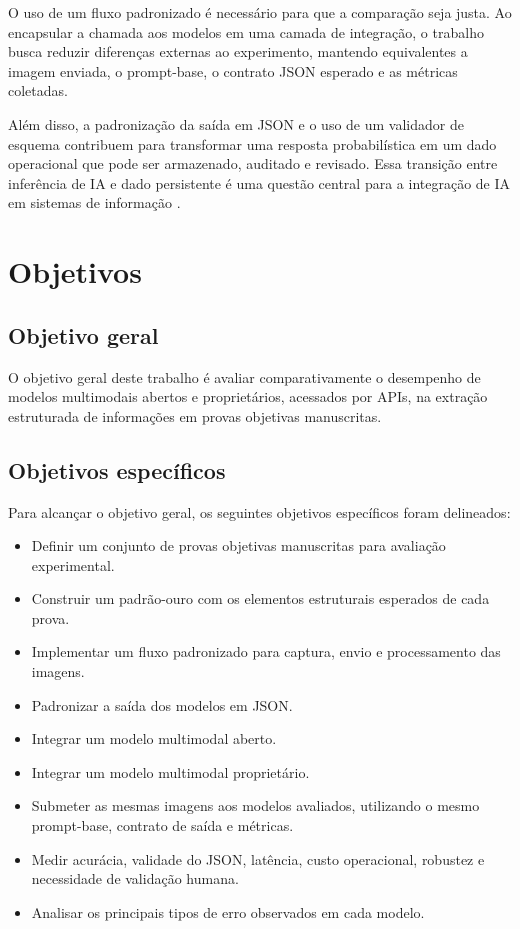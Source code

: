 O uso de um fluxo padronizado é necessário para que a comparação seja justa. Ao encapsular a chamada aos modelos em uma camada de integração, o trabalho busca reduzir diferenças externas ao experimento, mantendo equivalentes a imagem enviada, o prompt-base, o contrato JSON esperado e as métricas coletadas.

Além disso, a padronização da saída em JSON e o uso de um validador de esquema contribuem para transformar uma resposta probabilística em um dado operacional que pode ser armazenado, auditado e revisado. Essa transição entre inferência de IA e dado persistente é uma questão central para a integração de IA em sistemas de informação \cite{nist2023airmf,raji2020audit,amershi2019humanai,mitchell2019modelcards}.

\section{Objetivos}

\subsection{Objetivo geral}\label{objger}

O objetivo geral deste trabalho é avaliar comparativamente o desempenho de modelos multimodais abertos e proprietários, acessados por APIs, na extração estruturada de informações em provas objetivas manuscritas.

\subsection{Objetivos específicos}\label{objesp}

Para alcançar o objetivo geral, os seguintes objetivos específicos foram delineados:

\begin{itemize}
    \item Definir um conjunto de provas objetivas manuscritas para avaliação experimental.
    \item Construir um padrão-ouro com os elementos estruturais esperados de cada prova.
    \item Implementar um fluxo padronizado para captura, envio e processamento das imagens.
    \item Padronizar a saída dos modelos em JSON.
    \item Integrar um modelo multimodal aberto.
    \item Integrar um modelo multimodal proprietário.
    \item Submeter as mesmas imagens aos modelos avaliados, utilizando o mesmo prompt-base, contrato de saída e métricas.
    \item Medir acurácia, validade do JSON, latência, custo operacional, robustez e necessidade de validação humana.
    \item Analisar os principais tipos de erro observados em cada modelo.
\end{itemize}
